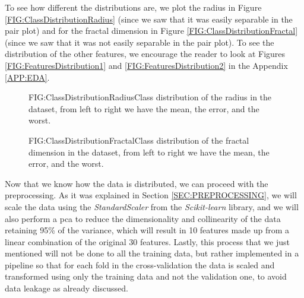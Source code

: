 To see how different the distributions are, we plot the radius in Figure \ref{FIG:ClassDistributionRadius} (since we saw that it was easily separable in the pair plot) and for the fractal dimension in Figure \ref{FIG:ClassDistributionFractal} (since we saw that it was not easily separable in the pair plot). To see the distribution of the other features, we encourage the reader to look at Figures \ref{FIG:FeaturesDistribution1} and \ref{FIG:FeaturesDistribution2} in the Appendix \ref{APP:EDA}.


\begin{figure}[Class Distribution of the Radius]{FIG:ClassDistributionRadius}{Class distribution of the radius in the dataset, from left to right we have the mean, the error, and the worst.}
\end{figure}

\begin{figure}[Class Distribution of the Fractal Dimension]{FIG:ClassDistributionFractal}{Class distribution of the fractal dimension in the dataset, from left to right we have the mean, the error, and the worst.}
\end{figure}

Now that we know how the data is distributed, we can proceed with the preprocessing. As it was explained in Section \ref{SEC:PREPROCESSING}, we will scale the data using the \textit{StandardScaler} from the \textit{Scikit-learn} library, and we will also perform a \ac{pca} to reduce the dimensionality and collinearity of the data retaining 95\% of the variance, which will result in 10 features made up from a linear combination of the original 30 features. Lastly, this process that we just mentioned will not be done to all the training data, but rather implemented in a pipeline so that for each fold in the cross-validation the data is scaled and transformed using only the training data and not the validation one, to avoid data leakage as already discussed.